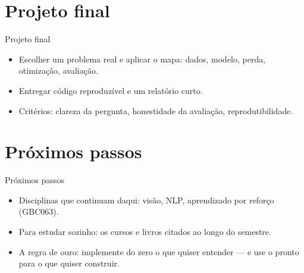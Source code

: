 \documentclass[aspectratio=169, 11pt]{beamer}
\begin{document}
\section{Projeto final}

\begin{frame}{Projeto final}
  \begin{itemize}\setlength{\itemsep}{0.4ex}
    \item Escolher um problema real e aplicar o mapa: dados, modelo, perda,
          otimização, avaliação.
    \item Entregar código reproduzível e um relatório curto.
    \item Critérios: clareza da pergunta, honestidade da avaliação,
          reprodutibilidade.
  \end{itemize}
\end{frame}

\section{Próximos passos}

\begin{frame}{Próximos passos}
  \begin{itemize}\setlength{\itemsep}{0.4ex}
    \item Disciplinas que continuam daqui: visão, NLP, aprendizado por
          reforço (GBC063).
    \item Para estudar sozinho: os cursos e livros citados ao longo do
          semestre.
    \item A regra de ouro: implemente do zero o que quiser entender —
          e use o pronto para o que quiser construir.
  \end{itemize}
\end{frame}
\end{document}
